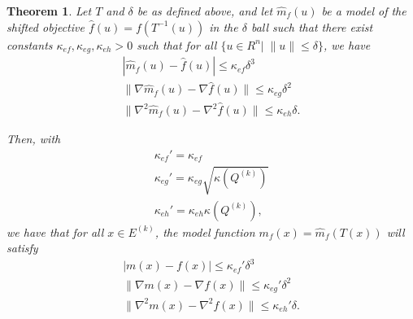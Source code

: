 \documentclass{article}
\newtheorem{theorem}{Theorem}[section]
\theoremstyle{case}
\newcommand{\ellipsek}{{E^{(k)}}}
\newcommand{\qk}{{Q^{(k)}}}
\begin{document}
\begin{theorem}
Let $T$ and $\delta$ be as defined above, and let $\hat m_f(u)$ be a model of the shifted objective $\hat f(u) = f(T^{-1}(u))$ in the $\delta$ ball such that
there exist constants $\kappa_{ef}, \kappa_{eg}, \kappa_{eh} > 0$ such that for all $\{u \in R^n | \;\|u\| \le \delta \}$, we have
\begin{align*}
|\hat m_f(u) - \hat f(u)| \le \kappa_{ef} \delta^3\\
\|\nabla \hat m_f(u) - \nabla \hat f(u)\| \le \kappa_{eg}\delta^2\\
\|\nabla^2 \hat m_f(u) - \nabla^2 \hat f(u)\| \le \kappa_{eh}\delta.
\end{align*}

Then, with
\begin{align*}
\kappa_{ef}' = \kappa_{ef} \\
\kappa_{eg}' = \kappa_{eg}\sqrt{\kappa(\qk)} \\
\kappa_{eh}' = \kappa_{eh}\kappa(\qk),
\end{align*}
we have that for all $x \in \ellipsek$,
the model function $m_f(x) = \hat m_f(T(x))$ will satisfy
\begin{align*}
| m(x) - f(x)| \le \kappa_{ef}'\delta^3 \\
\|\nabla  m(x) - \nabla  f(x)\| \le \kappa_{eg}'\delta^2 \\
\|\nabla^2 m(x) - \nabla^2 f(x)\| \le \kappa_{eh}'\delta.
\end{align*}
\end{theorem}
\end{document}
